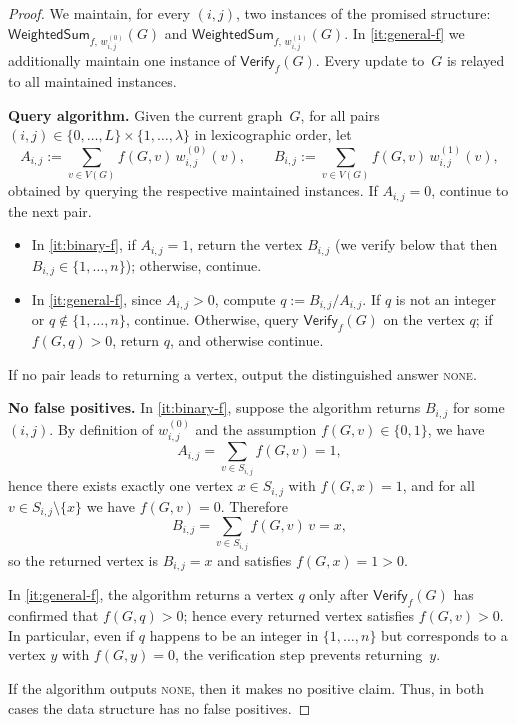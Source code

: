 \begin{proof}
We maintain, for every $(i,j)$, two instances of the promised structure:
$\mathsf{WeightedSum}_{f,\,w^{(0)}_{i,j}}(G)$ and
$\mathsf{WeightedSum}_{f,\,w^{(1)}_{i,j}}(G)$.
In \cref{it:general-f} we additionally maintain one instance of
$\mathsf{Verify}_{f}(G)$.
Every update to~$G$ is relayed to all maintained instances.

\smallskip
\noindent\textbf{Query algorithm.}
Given the current graph~$G$, for all pairs
$(i,j)\in\{0,\dots,L\}\times\{1,\dots,\lambda\}$ in lexicographic order, let
\[
A_{i,j} := \sum_{v\in V(G)} f(G,v)\,w^{(0)}_{i,j}(v),
\qquad
B_{i,j} := \sum_{v\in V(G)} f(G,v)\,w^{(1)}_{i,j}(v),
\]
obtained by querying the respective maintained instances.
If $A_{i,j}=0$, continue to the next pair.
\begin{itemize}
\item In \cref{it:binary-f}, if $A_{i,j}=1$, return the vertex
$B_{i,j}$ (we verify below that then $B_{i,j}\in\{1,\dots,n\}$); otherwise,
continue.
\item In \cref{it:general-f}, since $A_{i,j}>0$, compute $q := B_{i,j}/A_{i,j}$.
If $q$ is not an integer or $q\notin\{1,\dots,n\}$, continue.
Otherwise, query $\mathsf{Verify}_f(G)$ on the vertex $q$;
if $f(G,q)>0$, return $q$, and otherwise continue.
\end{itemize}
If no pair leads to returning a vertex, output the distinguished answer
\textsc{none}.

\smallskip
\noindent\textbf{No false positives.}
In \cref{it:binary-f}, suppose the algorithm returns $B_{i,j}$ for
some $(i,j)$.
By definition of $w^{(0)}_{i,j}$ and the assumption
$f(G,v)\in\{0,1\}$, we have
\[
A_{i,j}=\sum_{v\in S_{i,j}} f(G,v)=1,
\]
hence there exists exactly one vertex $x\in S_{i,j}$ with $f(G,x)=1$, and
for all $v\in S_{i,j}\setminus\{x\}$ we have $f(G,v)=0$.
Therefore
\[
B_{i,j}=\sum_{v\in S_{i,j}} f(G,v)\,v=x,
\]
so the returned vertex is $B_{i,j}=x$ and satisfies
$f(G,x)=1>0$.

In \cref{it:general-f}, the algorithm returns a vertex $q$ only after
$\mathsf{Verify}_f(G)$ has confirmed that $f(G,q)>0$; hence every
returned vertex satisfies $f(G,v)>0$.
In particular, even if $q$ happens to be an integer in $\{1,\dots,n\}$ but
corresponds to a vertex $y$ with $f(G,y)=0$, the verification step prevents
returning~$y$.

If the algorithm outputs \textsc{none}, then it makes no positive claim.
Thus, in both cases the data structure has no false positives.


\end{proof}
